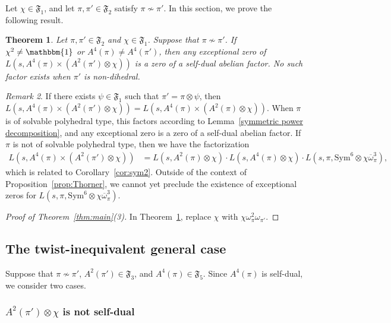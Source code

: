 \documentclass[11pt]{amsart}
\newtheorem{theorem}{Theorem}[section]
\theoremstyle{remark}
\newtheorem{remark}[theorem]{Remark}
\newcommand{\Sym}{\mathrm{Sym}}
\renewcommand{\bar}{\overline}
\numberwithin{equation}{section}
\begin{document}
Let $\chi\in\mathfrak{F}_1$, and let $\pi,\pi'\in\mathfrak{F}_2$ satisfy $\pi\not\sim\pi'$.  In this section, we prove the following result.

\begin{theorem}
\label{thm:GL5xGL3}
Let $\pi,\pi'\in\mathfrak{F}_2$ and $\chi\in\mathfrak{F}_1$.  Suppose that $\pi\not\sim\pi'$.  If $\chi^2\neq\mathbbm{1}$ or $A^4(\pi)\neq A^4(\pi')$, then any exceptional zero of $L(s,A^4(\pi)\times(A^2(\pi')\otimes\chi))$ is a zero of a self-dual abelian factor.  No such factor exists when $\pi'$ is non-dihedral.
\end{theorem}
\begin{remark}
If there exists $\psi\in\mathfrak{F}_1$ such that $\pi'=\pi\otimes\psi$, then $L(s,A^4(\pi)\times(A^2(\pi')\otimes\chi))=L(s,A^4(\pi)\times(A^2(\pi)\otimes\chi))$.  When $\pi$ is of solvable polyhedral type, this factors according to Lemma~\ref{symmetric power decomposition}, and any exceptional zero is a zero of a self-dual abelian factor.  If $\pi$ is not of solvable polyhedral type, then we have the factorization
\begin{align*}
L(s,A^4(\pi)\times(A^2(\pi')\otimes\chi))
&=L(s,A^2(\pi)\otimes\chi)\cdot L(s,A^4(\pi)\otimes\chi)\cdot L(s,\pi,\Sym^6\otimes\chi\bar{\omega}_{\pi}^3),
\end{align*}
which is related to Corollary~\ref{cor:sym2}.  Outside of the context of Proposition~\ref{prop:Thorner}, we cannot yet preclude the existence of exceptional zeros for $L(s,\pi,\Sym^6\otimes\chi\bar{\omega}_{\pi}^3)$.
\end{remark}
\begin{proof}[Proof of Theorem~\ref{thm:main}(3)]
In Theorem~\ref{thm:GL5xGL3}, replace $\chi$ with $\chi\omega_{\pi}^2\omega_{\pi'}$.
\end{proof}

\subsection{The twist-inequivalent general case}

Suppose that $\pi \not\sim \pi'$, $A^2(\pi')\in\mathfrak{F}_3$, and  $A^4(\pi)\in\mathfrak{F}_5$.  Since $A^4(\pi)$ is self-dual, we consider two cases.

\subsubsection{$A^2(\pi') \otimes \chi$ is not self-dual}
\end{document}
